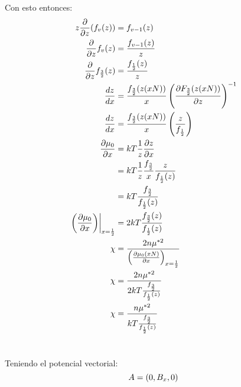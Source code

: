 \documentclass{report}
\begin{document}
Con esto entonces:
\begin{align*}
  z \frac{\partial}{\partial z} (f_v(z)) &= f_{v-1}(z)\\
  \frac{\partial}{\partial z} f_v(z) &= \frac{f_{v-1}(z)}{z}\\
  \frac{\partial}{\partial z} f_{\frac{3}{2}}(z) &= \frac{f_{\frac{1}{2}}(z)}{z}\\
  \frac{dz}{dx} &= \frac{f_{\frac{3}{2}}(z(xN))}{x}\left(\frac{\partial F_{\frac{3}{2}}(z(xN))}{\partial z}\right)^{-1}\\
  \frac{dz}{dx} &= \frac{f_{\frac{3}{2}}(z(xN))}{x}\left(\frac{z}{f_{\frac{1}{2}}}\right)\\
  \frac{\partial \mu_0}{\partial x} &= kT \frac{1}{z} \frac{\partial z}{\partial x}\\
  &= kT \frac{1}{z}\frac{f_{\frac{3}{2}}}{x}\frac{z}{f_{\frac{1}{2}}(z)}\\
  &= kT \frac{f_{\frac{3}{2}}}{f_{\frac{1}{2}}(z)}\\
  \left.\left(\frac{\partial \mu_0}{\partial x}\right)\right|_{x = \frac{1}{2}} &= 2kT \frac{f_{\frac{3}{2}}(z)}{f_{\frac{1}{2}}(z)}\\
  \chi &= \frac{2n \mu^{*2}}{\left(\frac{\partial \mu_0(xN)}{\partial x}\right)_{x = \frac{1}{2}}}\\
  \chi &= \frac{2n \mu^{*2}}{2 kT \frac{f_{\frac{3}{2}}}{f_{\frac{1}{2}}(z)}}\\
  \chi &= \frac{n \mu^{*2}}{kT \frac{f_{\frac{3}{2}}}{f_{\frac{1}{2}}(z)}}\\
\end{align*}

\section{}

\section{}

\chapter{}

\section{}

Teniendo el potencial vectorial:
\[
  A = \left(0, B_x, 0\right)
\]
\end{document}
